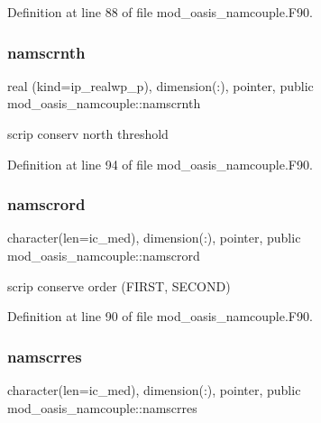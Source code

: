 Definition at line 88 of file mod\+\_\+oasis\+\_\+namcouple.\+F90.

\mbox{\label{namespacemod__oasis__namcouple_a3118551c00a0292c1af684ece57cc8f0}} 
\subsubsection{\texorpdfstring{namscrnth}{namscrnth}}
{\footnotesize\ttfamily real (kind=ip\+\_\+realwp\+\_\+p), dimension(\+:), pointer, public mod\+\_\+oasis\+\_\+namcouple\+::namscrnth}



scrip conserv north threshold 



Definition at line 94 of file mod\+\_\+oasis\+\_\+namcouple.\+F90.

\mbox{\label{namespacemod__oasis__namcouple_ac881ced105604879ada860fabd677481}} 
\subsubsection{\texorpdfstring{namscrord}{namscrord}}
{\footnotesize\ttfamily character(len=ic\+\_\+med), dimension(\+:), pointer, public mod\+\_\+oasis\+\_\+namcouple\+::namscrord}



scrip conserve order (F\+I\+R\+ST, S\+E\+C\+O\+ND) 



Definition at line 90 of file mod\+\_\+oasis\+\_\+namcouple.\+F90.

\mbox{\label{namespacemod__oasis__namcouple_a6a95ddbbbc615e0257d93d05e4546239}} 
\subsubsection{\texorpdfstring{namscrres}{namscrres}}
{\footnotesize\ttfamily character(len=ic\+\_\+med), dimension(\+:), pointer, public mod\+\_\+oasis\+\_\+namcouple\+::namscrres}



